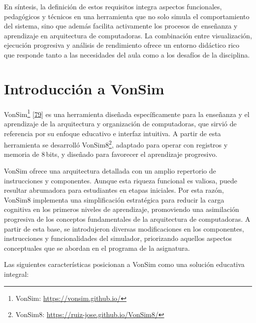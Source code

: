 \documentclass[12pt,oneside]{templates/unerthesis}
\begin{document}
En síntesis, la definición de estos requisitos integra aspectos funcionales, pedagógicos y técnicos en una herramienta que no solo simula el comportamiento del sistema, sino que además facilita activamente los procesos de enseñanza y aprendizaje en arquitectura de computadoras. La combinación entre visualización, ejecución progresiva y análisis de rendimiento ofrece un entorno didáctico rico que responde tanto a las necesidades del aula como a los desafíos de la disciplina.

\hypertarget{introducciuxf3n-a-vonsim}{%
\section{Introducción a VonSim}\label{introducciuxf3n-a-vonsim}}

VonSim\footnote{VonSim: \url{https://vonsim.github.io/}} \protect\hyperlink{ref-vonsim}{{[}79{]}} es una herramienta diseñada específicamente para la enseñanza y el aprendizaje de la arquitectura y organización de computadoras, que sirvió de referencia por su enfoque educativo e interfaz intuitiva. A partir de esta herramienta se desarrolló VonSim8\footnote{VonSim8: \url{https://ruiz-jose.github.io/VonSim8/}}, adaptado para operar con registros y memoria de 8\,bits, y diseñado para favorecer el aprendizaje progresivo.

VonSim ofrece una arquitectura detallada con un amplio repertorio de instrucciones y componentes. Aunque esta riqueza funcional es valiosa, puede resultar abrumadora para estudiantes en etapas iniciales. Por esta razón, VonSim8 implementa una simplificación estratégica para reducir la carga cognitiva en los primeros niveles de aprendizaje, promoviendo una asimilación progresiva de los conceptos fundamentales de la arquitectura de computadoras. A partir de esta base, se introdujeron diversas modificaciones en los componentes, instrucciones y funcionalidades del simulador, priorizando aquellos aspectos conceptuales que se abordan en el programa de la asignatura.

Las siguientes características posicionan a VonSim como una solución educativa integral:
\end{document}
